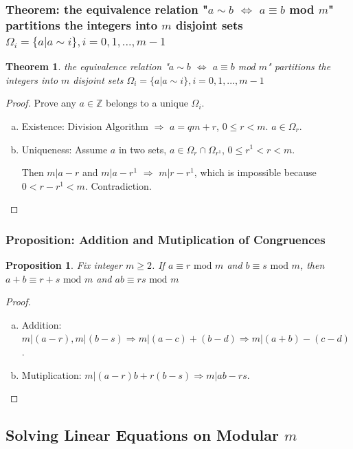 \documentclass[11pt,a4paper]{article}
\newtheorem{theorem}{Theorem}
\newtheorem{proposition}{Proposition}
\begin{document}
\subsubsection{Theorem: the equivalence relation "$a\sim b$ $\Leftrightarrow$ $a\equiv b$ mod $m$" partitions the integers into $m$ disjoint sets $\Omega_i=\{a|a\sim i\},i=0,1,...,m-1$}
\begin{theorem}
    the equivalence relation "$a\sim b$ $\Leftrightarrow$ $a\equiv b$ mod $m$" partitions the integers into $m$ disjoint sets $\Omega_i=\{a|a\sim i\},i=0,1,...,m-1$
\end{theorem}
\begin{proof}
    Prove any $a\in \mathbb{Z}$ belongs to a unique $\Omega_i$.

    \begin{enumerate}[a)]
        \item Existence: Division Algorithm $\Rightarrow$ $a=qm+r$, $0\leq r<m$. $a\in\Omega_r$.
        \item Uniqueness: Assume $a$ in two sets, $a\in\Omega_r\cap \Omega_{r^1}$, $0\leq r^1<r<m$.
        
        Then $m|a-r$ and $m|a-r^1$ $\Rightarrow$ $m|r-r^1$, which is impossible because $0<r-r^1<m$. Contradiction.
    \end{enumerate}
\end{proof}

\subsubsection{Proposition: Addition and Mutiplication of Congruences}
\begin{proposition}
    Fix integer $m\geq 2$. If $a\equiv r \text{ mod }m$ and $b\equiv s \text{ mod }m$, then $a+b\equiv r+s \text{ mod }m$ and $ab\equiv rs \text{ mod }m$
\end{proposition}
\begin{proof}
\quad

\begin{enumerate}[a)]
    \item Addition: $m|(a-r), m|(b-s)\Rightarrow m|(a-c)+(b-d)\Rightarrow m|(a+b)-(c-d)$.
    \item Mutiplication: $m|(a-r)b+r(b-s)\Rightarrow m|ab-rs$.
\end{enumerate}
\end{proof}

\subsection{Solving Linear Equations on Modular $m$}
\end{document}
